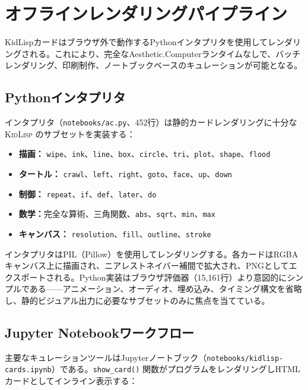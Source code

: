 \documentclass[10pt,letterpaper,twocolumn]{article}
\newcommand{\acdot}{{\color{acpink}.}}
\newcommand{\kidlisp}{\textsc{KidLisp}}
\begin{document}

\section{オフラインレンダリングパイプライン}
\label{sec:pipeline}

KidLispカードはブラウザ外で動作するPythonインタプリタを使用してレンダリングされる。これにより、完全なAesthetic\acdot Computerランタイムなしで、バッチレンダリング、印刷制作、ノートブックベースのキュレーションが可能となる。

\subsection{Pythonインタプリタ}

インタプリタ（\texttt{notebooks/ac.py}、452行）は静的カードレンダリングに十分な \kidlisp{} のサブセットを実装する：

\begin{itemize}
  \item \textbf{描画：} \texttt{wipe}、\texttt{ink}、\texttt{line}、\texttt{box}、\texttt{circle}、\texttt{tri}、\texttt{plot}、\texttt{shape}、\texttt{flood}
  \item \textbf{タートル：} \texttt{crawl}、\texttt{left}、\texttt{right}、\texttt{goto}、\texttt{face}、\texttt{up}、\texttt{down}
  \item \textbf{制御：} \texttt{repeat}、\texttt{if}、\texttt{def}、\texttt{later}、\texttt{do}
  \item \textbf{数学：}完全な算術、三角関数、\texttt{abs}、\texttt{sqrt}、\texttt{min}、\texttt{max}
  \item \textbf{キャンバス：} \texttt{resolution}、\texttt{fill}、\texttt{outline}、\texttt{stroke}
\end{itemize}

インタプリタはPIL（Pillow）を使用してレンダリングする。各カードはRGBAキャンバス上に描画され、ニアレストネイバー補間で拡大され、PNGとしてエクスポートされる。Python実装はブラウザ評価器（15,161行）より意図的にシンプルである——アニメーション、オーディオ、埋め込み、タイミング構文を省略し、静的ビジュアル出力に必要なサブセットのみに焦点を当てている。

\subsection{Jupyter Notebookワークフロー}

主要なキュレーションツールはJupyterノートブック（\texttt{notebooks/kidlisp-cards.ipynb}）である。\texttt{show\_card()} 関数がプログラムをレンダリングしHTMLカードとしてインライン表示する：
\end{document}

